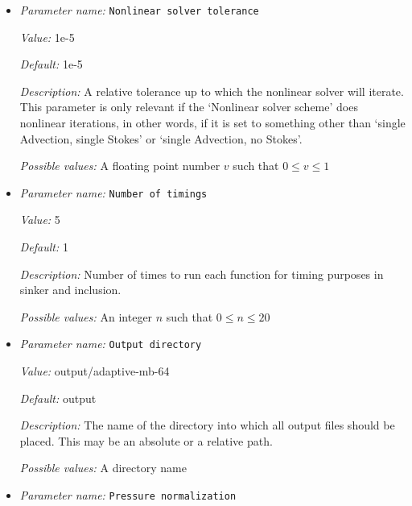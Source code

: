 \begin{itemize}
{\it Possible values:} Any one of single Advection, single Stokes, iterated Advection and Stokes, single Advection, iterated Stokes, no Advection, iterated Stokes, iterated Advection and Newton Stokes, single Advection, no Stokes, IMPES, iterated IMPES, iterated Stokes, Newton Stokes, Stokes only, Advection only, first timestep only, single Stokes, no Advection, no Stokes
\item {\it Parameter name:} {\tt Nonlinear solver tolerance}
\label{parameters:Nonlinear solver tolerance}
\label{parameters:Nonlinear_20solver_20tolerance}


{\it Value:} 1e-5


{\it Default:} 1e-5


{\it Description:} A relative tolerance up to which the nonlinear solver will iterate. This parameter is only relevant if the `Nonlinear solver scheme' does nonlinear iterations, in other words, if it is set to something other than `single Advection, single Stokes' or `single Advection, no Stokes'.


{\it Possible values:} A floating point number $v$ such that $0 \leq v \leq 1$
\item {\it Parameter name:} {\tt Number of timings}
\label{parameters:Number of timings}
\label{parameters:Number_20of_20timings}


{\it Value:} 5


{\it Default:} 1


{\it Description:} Number of times to run each function for timing purposes in sinker and inclusion.


{\it Possible values:} An integer $n$ such that $0\leq n \leq 20$
\item {\it Parameter name:} {\tt Output directory}
\label{parameters:Output directory}
\label{parameters:Output_20directory}


{\it Value:} output/adaptive-mb-64


{\it Default:} output


{\it Description:} The name of the directory into which all output files should be placed. This may be an absolute or a relative path.


{\it Possible values:} A directory name
\item {\it Parameter name:} {\tt Pressure normalization}
\label{parameters:Pressure normalization}
\label{parameters:Pressure_20normalization}



\end{itemize}
